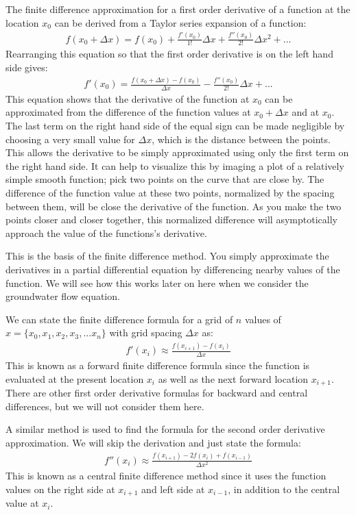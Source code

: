 \documentclass[11pt, oneside]{article}   	%
\begin{document}
 The finite difference approximation for a first order derivative of a function at the location $x_0$ can be derived from a Taylor series expansion of a function:
 \begin{eqnarray}
f(x_0 + \Delta x) = f(x_0) + \frac{f'(x_0)}{1!} \Delta x + \frac{f''(x_0)}{2!}\Delta x^2 + ...
\end{eqnarray}
Rearranging this equation so that the first order derivative is on the left hand side gives:
\begin{eqnarray}
f'(x_0) = \frac{f(x_0 + \Delta x) - f(x_0)}{\Delta x} - \frac{f''(x_0)}{2!} \Delta x + ...
\end{eqnarray}
This equation shows that  the derivative of the function at $x_0$ can be approximated from the difference of the function values at $x_0+ \Delta x$ and at $x_0$.   The last term on the right hand side of the equal sign can be made negligible by choosing a very small value for $\Delta x$, which is the distance between the points. This allows the derivative to be simply approximated using only the first term on the right hand side. It can help to visualize this by imaging a plot of a relatively simple smooth function; pick two points on the curve that are close by. The difference of the function value at these two points, normalized by the spacing between them, will be close the derivative of the function. As you make the two points closer and closer together, this normalized difference will asymptotically approach the value of the functions's derivative.
 
This is the basis of the finite difference method. You simply approximate the derivatives in a partial differential equation by differencing nearby values of the function. We will see how this works later on here when we consider the groundwater flow equation.

We can state the finite difference formula for a grid of $n$ values of $x = \{x_0, x_1, x_2, x_3, ... x_n\}$ with grid spacing $\Delta x$ as:
\begin{eqnarray}
f'(x_i) \approx \frac{f(x_{i+1}) - f(x_i)}{\Delta x} 
\label{FOFD}
\end{eqnarray}
This is known as a forward finite difference formula since the function is evaluated at the present location $x_i$ as well as the next forward location $x_{i+1}$. There are other first order derivative formulas for backward and central differences, but we will not consider them here.

A similar method is used to find the formula for the second order derivative approximation. We will skip the derivation and just state the formula:
\begin{eqnarray}
f''(x_i) \approx \frac{f(x_{i+1}) - 2 f(x_i) + f(x_{i-1})  }{\Delta x^2} 
\label{SOFD}
\end{eqnarray}
This is known as a central finite difference method since it uses the function  values on the right side at $x_{i+1}$ and left side at $x_{i-1}$, in addition to the central value at $x_i$.
\end{document}
